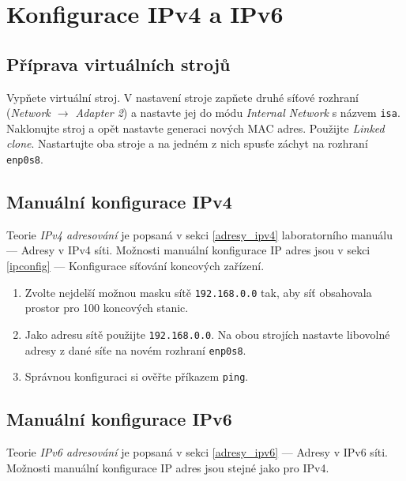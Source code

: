 \section{Konfigurace IPv4 a IPv6}

\subsection*{Příprava virtuálních strojů}
Vypňete virtuální stroj.
V nastavení stroje zapňete druhé síťové rozhraní (\textit{Network $\rightarrow$ Adapter 2}) a nastavte jej do módu \textit{Internal Network} s názvem \texttt{isa}.
Naklonujte stroj a opět nastavte generaci nových MAC adres. Použijte \textit{Linked clone}.
Nastartujte oba stroje a na jedném z nich spusťe záchyt na rozhraní \texttt{enp0s8}.

\subsection{Manuální konfigurace IPv4}

Teorie \emph{IPv4 adresování} je popsaná v sekci \ref{adresy_ipv4} laboratorního manuálu --- Adresy v IPv4 síti.
Možnosti manuální konfigurace IP adres jsou v sekci \ref{ipconfig} --- Konfigurace síťování koncových zařízení.

\begin{enumerate}
    \item Zvolte nejdelší možnou masku sítě \texttt{192.168.0.0} tak, aby síť obsahovala prostor pro 100 koncových stanic.
    \item Jako adresu sítě použijte \texttt{192.168.0.0}.
      Na obou strojích nastavte libovolné adresy z dané síťe na novém rozhraní \texttt{enp0s8}.
    \item Správnou konfiguraci si ověřte příkazem {\tt ping}.
\end{enumerate}

\subsection{Manuální konfigurace IPv6}
Teorie \emph{IPv6 adresování} je popsaná v sekci \ref{adresy_ipv6} --- Adresy v IPv6 síti.
Možnosti manuální konfigurace IP adres jsou stejné jako pro IPv4.

